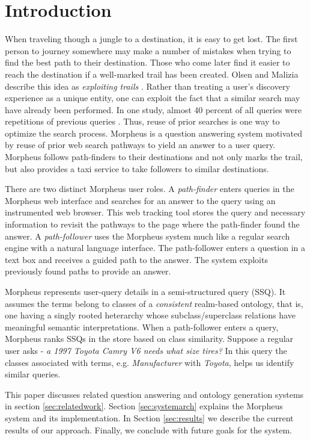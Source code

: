 \section{Introduction}



When traveling though a jungle to a destination, it is easy to get lost.  The first person to journey somewhere may make a number of mistakes when trying to find the best path to their destination. Those who come later find it easier to reach the destination if a well-marked trail has been created. Olsen and Malizia describe this idea as \emph{exploiting trails} \cite{5379671}.  Rather than treating a user's discovery experience as a unique entity, one can exploit the fact that a similar search may have already been performed.  In one study, almost 40 percent of all queries were repetitions of previous queries \cite{1277770}. Thus, reuse of prior searches is one way to optimize the search
process.  Morpheus is a question answering system motivated by reuse of prior web search pathways to yield an answer to a user query. Morpheus follows path-finders to their destinations and not only marks the trail, but also provides a taxi service to take followers to similar
destinations.

There are two distinct Morpheus user roles. A
\textit{path-finder} enters queries in the Morpheus web interface and
searches for an answer to the query using an instrumented web browser. 
This web tracking tool stores the query
and necessary information to revisit the pathways to the page where the path-finder 
found the answer. A \textit{path-follower} uses the Morpheus system much like a regular search engine with a natural language interface. The path-follower enters a question in a text box and receives a guided path to the answer. The system exploits previously found paths to provide an answer.

Morpheus represents user-query details in a semi-structured query (SSQ). It assumes the terms belong to classes of a \textit{consistent} realm-based ontology, that is, one having a singly rooted heterarchy whose subclass/superclass relations have meaningful semantic interpretations. When a path-follower enters a query, Morpheus ranks SSQs in the store based on class similarity. Suppose a regular user asks -\textit{ a 1997 Toyota Camry V6 needs what size tires?} In this query the classes associated with terms, e.g. \emph{Manufacturer} with \emph{Toyota}, helps us identify similar queries.


This paper discusses related question answering and ontology generation systems in section \ref{sec:relatedwork}. Section \ref{sec:systemarch} explains the Morpheus system and its implementation. In Section \ref{sec:results} we describe the current results of our approach.  Finally, we conclude with future goals for the system.
